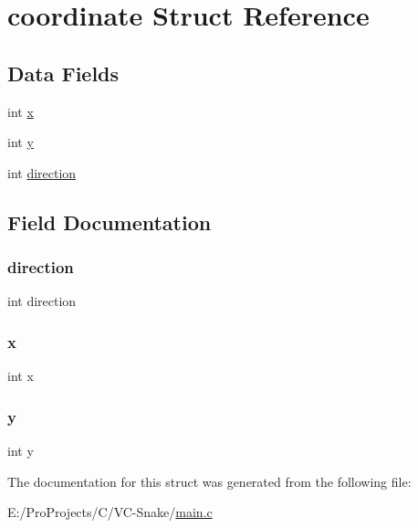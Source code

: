 \hypertarget{structcoordinate}{}\section{coordinate Struct Reference}
\label{structcoordinate}
\subsection*{Data Fields}
\begin{DoxyCompactItemize}
\item 
int \hyperlink{structcoordinate_a6150e0515f7202e2fb518f7206ed97dc}{x}
\item 
int \hyperlink{structcoordinate_a0a2f84ed7838f07779ae24c5a9086d33}{y}
\item 
int \hyperlink{structcoordinate_a886d551d5381dc3e53f17825ffc51641}{direction}
\end{DoxyCompactItemize}


\subsection{Field Documentation}
\mbox{\label{structcoordinate_a886d551d5381dc3e53f17825ffc51641}} 
\subsubsection{\texorpdfstring{direction}{direction}}
{\footnotesize\ttfamily int direction}

\mbox{\label{structcoordinate_a6150e0515f7202e2fb518f7206ed97dc}} 
\subsubsection{\texorpdfstring{x}{x}}
{\footnotesize\ttfamily int x}

\mbox{\label{structcoordinate_a0a2f84ed7838f07779ae24c5a9086d33}} 
\subsubsection{\texorpdfstring{y}{y}}
{\footnotesize\ttfamily int y}



The documentation for this struct was generated from the following file\+:\begin{DoxyCompactItemize}
\item 
E\+:/\+Pro\+Projects/\+C/\+V\+C-\/\+Snake/\hyperlink{main_8c}{main.\+c}\end{DoxyCompactItemize}
